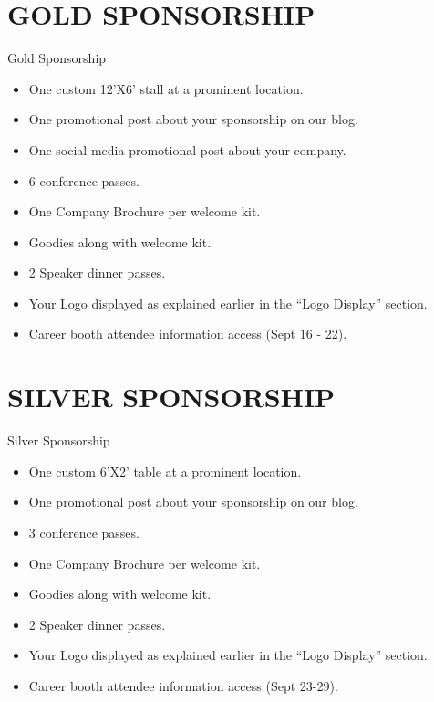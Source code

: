 \documentclass[10pt, compress, aspectratio=169]{beamer}
\begin{document}
\section{GOLD SPONSORSHIP}
\begin{frame}{Gold Sponsorship}
\begin{itemize}
    \item One custom 12’X6’ stall at a prominent location.        
    \item One promotional post about your sponsorship on our blog.
    \item One social media promotional post about your company.
    \item 6 conference passes.
    \item One Company Brochure per welcome kit.
    \item Goodies along with welcome kit.
    \item 2 Speaker dinner passes.
    \item Your Logo displayed as explained earlier in the “Logo Display” section.
    \item Career booth attendee information access (Sept 16 - 22).
\end{itemize}
\end{frame}


\section{SILVER SPONSORSHIP }
\begin{frame}{Silver Sponsorship}
\begin{itemize}
    \item One custom 6’X2’ table at a prominent location.        
    \item One promotional post about your sponsorship on our blog.
    \item 3 conference passes.
    \item One Company Brochure per welcome kit.
    \item Goodies along with welcome kit.
    \item 2 Speaker dinner passes.
    \item Your Logo displayed as explained earlier in the “Logo Display” section.    
    \item Career booth attendee information access (Sept 23-29).
\end{itemize}
\end{frame}
\end{document}
